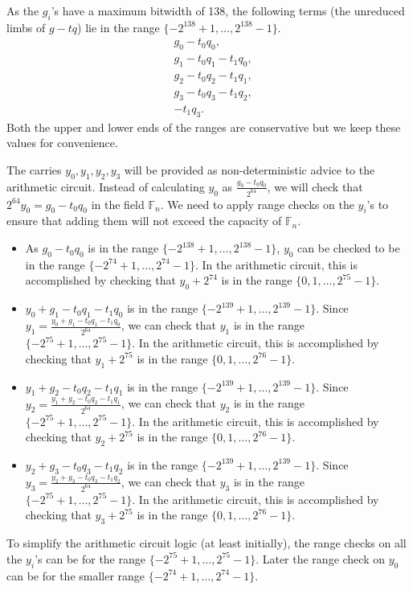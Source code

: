 \documentclass[a4paper, 12pt]{article}
\begin{document}
As the $g_i$'s have a maximum bitwidth of 138, the following terms (the unreduced limbs of $g-tq$) lie in the range $\{-2^{138}+1,\ldots, 2^{138}-1\}$.
\begin{align*}
  & g_0 - t_0q_0,\\
  & g_1 - t_0q_1-t_1q_0,\\
  & g_2 - t_0q_2-t_1q_1,\\
  & g_3 -  t_0q_3-t_1q_2,\\
  & - t_1q_3.
\end{align*}
Both the upper and lower ends of the ranges are conservative but we keep these values for convenience.


The carries $y_0,y_1,y_2,y_3$ will be provided as non-deterministic advice to the arithmetic circuit. Instead of calculating $y_0$ as $\frac{g_0-t_0q_0}{2^{64}}$, we will check that $2^{64}y_0 = g_0-t_0q_0$ in the field $\mathbb{F}_n$. We need to apply range checks on the $y_i$'s to ensure that adding them will not exceed the capacity of $\mathbb{F}_n$.

\begin{itemize}
  \item As $g_0 - t_0q_0$ is in the range $\{-2^{138}+1,\ldots, 2^{138}-1\}$, $y_0$ can be checked to be in the range $\{-2^{74}+1,\ldots, 2^{74}-1\}$. In the arithmetic circuit, this is accomplished by checking that $y_0 + 2^{74}$ is in the range $\{0,1,\ldots,2^{75}-1\}$.
  \item $y_0+g_1-t_0q_1-t_1q_0$ is in the range $\{-2^{139}+1,\ldots, 2^{139}-1\}$. Since $y_1 = \frac{y_0+g_1-t_0q_1-t_1q_0}{2^{64}}$, we can check that $y_1$ is in the range $\{-2^{75}+1,\ldots, 2^{75}-1\}$. In the arithmetic circuit, this is accomplished by checking that $y_1 + 2^{75}$ is in the range $\{0,1,\ldots,2^{76}-1\}$.
  \item $y_1+g_2-t_0q_2-t_1q_1$ is in the range $\{-2^{139}+1,\ldots, 2^{139}-1\}$. Since $y_2 = \frac{y_1+g_2-t_0q_2-t_1q_1}{2^{64}}$, we can check that $y_2$ is in the range $\{-2^{75}+1,\ldots, 2^{75}-1\}$. In the arithmetic circuit, this is accomplished by checking that $y_2 + 2^{75}$ is in the range $\{0,1,\ldots,2^{76}-1\}$.
  \item $y_2+g_3-t_0q_3-t_1q_2$ is in the range $\{-2^{139}+1,\ldots, 2^{139}-1\}$. Since $y_3 = \frac{y_2+g_3-t_0q_3-t_1q_2}{2^{64}}$, we can check that $y_3$ is in the range $\{-2^{75}+1,\ldots, 2^{75}-1\}$. In the arithmetic circuit, this is accomplished by checking that $y_3 + 2^{75}$ is in the range $\{0,1,\ldots,2^{76}-1\}$.
\end{itemize}
To simplify the arithmetic circuit logic (at least initially), the range checks on all the $y_i$'s can be for the range $\{-2^{75}+1,\ldots, 2^{75}-1\}$. Later the range check on $y_0$ can be for the smaller range $\{-2^{74}+1,\ldots,2^{74}-1\}$.
\end{document}
